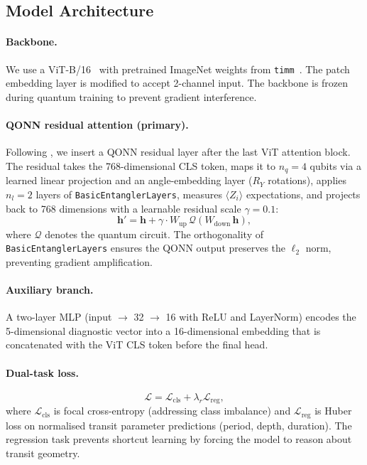 \documentclass{article}
\begin{document}
\subsection{Model Architecture}
\label{sec:architecture}

\paragraph{Backbone.}
We use a ViT-B/16~\citep{dosovitskiy2021} with pretrained ImageNet weights
from \texttt{timm}~\citep{timm2019}.  The patch embedding layer is modified to
accept 2-channel input.  The backbone is frozen during quantum training to
prevent gradient interference.

\paragraph{QONN residual attention (primary).}
Following \citet{tesi2024}, we insert a QONN residual layer after the last
ViT attention block.  The residual takes the 768-dimensional CLS token, maps
it to $n_q = 4$ qubits via a learned linear projection and an angle-embedding
layer ($R_Y$ rotations), applies $n_l = 2$ layers of \texttt{BasicEntanglerLayers},
measures $\langle Z_i \rangle$ expectations, and projects back to 768 dimensions
with a learnable residual scale $\gamma = 0.1$:
\[
\mathbf{h}' = \mathbf{h} + \gamma \cdot W_\text{up}\, \mathcal{Q}(W_\text{down}\,\mathbf{h}),
\]
where $\mathcal{Q}$ denotes the quantum circuit.
The orthogonality of \texttt{BasicEntanglerLayers} ensures the QONN output
preserves the $\ell_2$ norm, preventing gradient amplification.

\paragraph{Auxiliary branch.}
A two-layer MLP (input $\to$ 32 $\to$ 16 with ReLU and LayerNorm) encodes the
5-dimensional diagnostic vector into a 16-dimensional embedding that is
concatenated with the ViT CLS token before the final head.

\paragraph{Dual-task loss.}
\[
\mathcal{L} = \mathcal{L}_\text{cls} + \lambda_r \mathcal{L}_\text{reg},
\]
where $\mathcal{L}_\text{cls}$ is focal cross-entropy (addressing class
imbalance) and $\mathcal{L}_\text{reg}$ is Huber loss on normalised transit
parameter predictions (period, depth, duration).  The regression task prevents
shortcut learning by forcing the model to reason about transit geometry.
\end{document}
